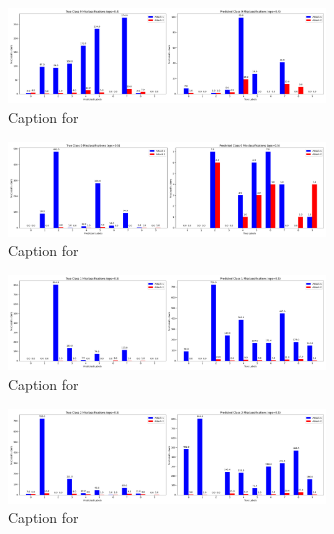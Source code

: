 \documentclass{article}
\begin{document}
\begin{figure}[!htbp]
\centering
\includegraphics[width=0.75\textwidth]{combined_class_boundary_pgd/combined_class_9_misclassifications_eps_0.4.png}
\caption{Caption for }
\label{fig:combined_class_9_misclassifications_eps_0.4.png}
\end{figure}



\begin{figure}[!htbp]
\centering
\includegraphics[width=0.75\textwidth]{combined_class_boundary_pgd/combined_class_0_misclassifications_eps_0.5.png}
\caption{Caption for }
\label{fig:combined_class_0_misclassifications_eps_0.5.png}
\end{figure}

\begin{figure}[!htbp]
\centering
\includegraphics[width=0.75\textwidth]{combined_class_boundary_pgd/combined_class_1_misclassifications_eps_0.5.png}
\caption{Caption for }
\label{fig:combined_class_1_misclassifications_eps_0.5.png}
\end{figure}

\begin{figure}[!htbp]
\centering
\includegraphics[width=0.75\textwidth]{combined_class_boundary_pgd/combined_class_2_misclassifications_eps_0.5.png}
\caption{Caption for }
\label{fig:combined_class_2_misclassifications_eps_0.5.png}
\end{figure}
\end{document}
